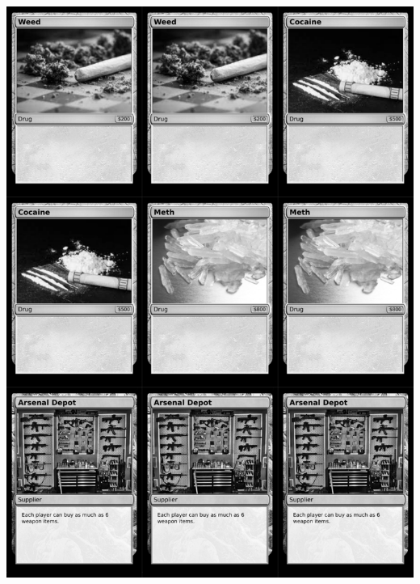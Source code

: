 \documentclass[a4paper]{article}
\begin{document}
\newpage

\begin{center}
	\centering
	\includegraphics[width=200.5mm,height=280.7mm]{output/temp/page3.png}
\end{center}
\end{document}
